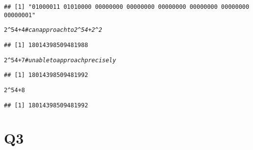 \documentclass{article}\usepackage[]{graphicx}\usepackage[]{color}
\makeatletter
\newcommand{\hlnum}[1]{\textcolor[rgb]{0.686,0.059,0.569}{#1}}%
\newcommand{\hlcom}[1]{\textcolor[rgb]{0.678,0.584,0.686}{\textit{#1}}}%
\newcommand{\hlopt}[1]{\textcolor[rgb]{0,0,0}{#1}}%
\newenvironment{kframe}{%
 \def\at@end@of@kframe{}%
 \ifinner\ifhmode%
  \def\at@end@of@kframe{\end{minipage}}%
  \begin{minipage}{\columnwidth}%
 \fi\fi%
 \def\FrameCommand##1{\hskip\@totalleftmargin \hskip-\fboxsep
 \colorbox{shadecolor}{##1}\hskip-\fboxsep
     \hskip-\linewidth \hskip-\@totalleftmargin \hskip\columnwidth}%
 \MakeFramed {\advance\hsize-\width
   \@totalleftmargin\z@ \linewidth\hsize
   \@setminipage}}%
 {\par\unskip\endMakeFramed%
 \at@end@of@kframe}
\newenvironment{knitrout}{}{} %
\makeatother
\begin{document}
\begin{knitrout}
\begin{kframe}
\begin{alltt}
\end{alltt}
\begin{verbatim}
## [1] "01000011 01010000 00000000 00000000 00000000 00000000 00000000 00000001"
\end{verbatim}
\begin{alltt}
\hlnum{2}\hlopt{^}\hlnum{54} \hlopt{+} \hlnum{4}  \hlcom{#can approach to 2^54+2^2}
\end{alltt}
\begin{verbatim}
## [1] 18014398509481988
\end{verbatim}
\begin{alltt}
\hlnum{2}\hlopt{^}\hlnum{54} \hlopt{+} \hlnum{7}  \hlcom{#unable to approach precisely}
\end{alltt}
\begin{verbatim}
## [1] 18014398509481992
\end{verbatim}
\begin{alltt}
\hlnum{2}\hlopt{^}\hlnum{54} \hlopt{+} \hlnum{8}
\end{alltt}
\begin{verbatim}
## [1] 18014398509481992
\end{verbatim}
\end{kframe}
\end{knitrout}
\section{Q3}
\end{document}

